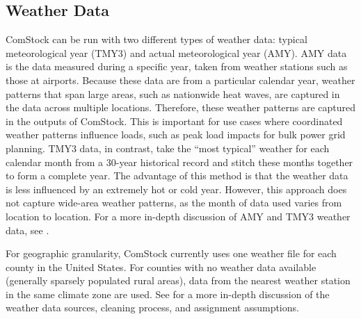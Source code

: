 

\subsection{Weather Data}
ComStock can be run with two different types of weather data: typical meteorological year (TMY3) and actual meteorological year (AMY). AMY data is the data measured during a specific year, taken from weather stations such as those at airports. Because these data are from a particular calendar year, weather patterns that span large areas, such as nationwide heat waves, are captured in the data across multiple locations. Therefore, these weather patterns are captured in the outputs of ComStock. This is important for use cases where coordinated weather patterns influence loads, such as peak load impacts for bulk power grid planning. TMY3 data, in contrast, take the ``most typical'' weather for each calendar month from a 30-year historical record and stitch these months together to form a complete year. The advantage of this method is that the weather data is less influenced by an extremely hot or cold year. However, this approach does not capture wide-area weather patterns, as the month of data used varies from location to location. For a more in-depth discussion of AMY and TMY3 weather data, see \cite{eulp_method_2022}.

For geographic granularity, ComStock currently uses one weather file for each county in the United States. For counties with no weather data available (generally sparsely populated rural areas), data from the nearest weather station in the same climate zone are used. See \citep{eulp_method_2022} for a more in-depth discussion of the weather data sources, cleaning process, and assignment assumptions.